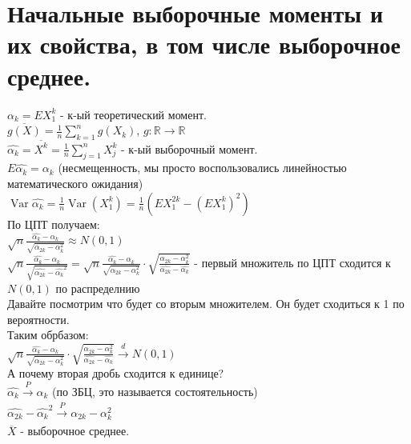 \documentclass{article}
\newcommand\0{\mathbb{0}}
\DeclareMathOperator{\Var}{Var}
\newcommand\1{\mathbb{1}}
\begin{document}
\section{Начальные выборочные моменты и их свойства, в том числе выборочное среднее.}
$\alpha_k = EX_1^k$ - к-ый теоретический момент.\\
$\overline{g(X)} = \frac{1}{n}\displaystyle\sum_{k = 1}^{n}g(X_k)$, $g: \mathbb{R} \to \mathbb{R}$\\
$\widehat{\alpha_k} = \overline{X^k} = \frac{1}{n}\displaystyle\sum_{j = 1}^{n}X_j^k$ - к-ый выборочный момент.\\
$E\widehat{\alpha_k} = \alpha_k$ (несмещенность, мы просто воспользовались линейностью математического ожидания)\\
$\Var\widehat{\alpha_k} = \frac{1}{n}\Var(X_1^k) = \frac{1}{n}(EX_1^{2k} - (EX_1^k)^2)$\\
По ЦПТ получаем:\\
$\sqrt{n}\frac{\widehat{\alpha_k} - \alpha_k}{\sqrt{\alpha_{2k} - \alpha_k^2}} \approx N(0,1)$\\
$\sqrt{n}\frac{\widehat{\alpha_k} - \alpha_k}{\sqrt{\widehat{\alpha_{2k}} - \widehat{\alpha_k}^2}} = \sqrt{n}\frac{\widehat{\alpha_k} - \alpha_k}{\sqrt{\alpha_{2k} - \alpha_k^{2}}} \cdot \sqrt{\frac{\alpha_{2k} - \alpha_k^2}{\widehat{\alpha_{2k}} - \widehat{\alpha_k}}}$ - первый множитель по ЦПТ сходится к $N(0,1)$ по распределнию\\
Давайте посмотрим что будет со вторым множителем. Он будет сходиться к 1 по вероятности.\\
Таким обрбазом:\\
$\sqrt{n}\frac{\widehat{\alpha_k} - \alpha_k}{\sqrt{\alpha_{2k} - \alpha_k^{2}}} \cdot \sqrt{\frac{\alpha_{2k} - \alpha_k^2}{\widehat{\alpha_{2k}} - \widehat{\alpha_k}}} \xrightarrow[]{d} N(0,1)$\\
А почему вторая дробь сходится к единице?\\
$\widehat{\alpha_k} \xrightarrow[]{P} \alpha_k$ (по ЗБЦ, это называется состоятельность)\\
$\widehat{\alpha_{2k}} - \widehat{\alpha_k}^2 \xrightarrow[]{P} \alpha_{2k} - \alpha_k^2$\\
$\overline{X}$ - выборочное среднее.\\
\end{document}
